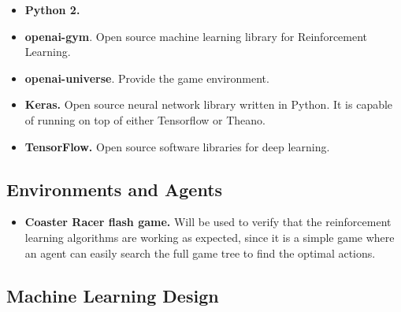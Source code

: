 \documentclass{article}
\begin{document}
\begin{itemize}

    \item \textbf{Python 2.}

    \item \textbf{openai-gym}. Open source machine learning library for Reinforcement Learning.
    
    \item \textbf{openai-universe}. Provide the game environment.

    \item \textbf{Keras.} Open source neural network library written in Python. It is capable of
        running on top of either Tensorflow or Theano.

    \item \textbf{TensorFlow.} Open source software libraries for deep learning.

\end{itemize}

\subsection{Environments and Agents}

\begin{itemize}

    \item \textbf{Coaster Racer flash game.} Will be used to verify that the reinforcement learning algorithms
        are working as expected, since it is a simple game where an agent can easily search the full
        game tree to find the optimal actions.

\end{itemize}

\subsection{Machine Learning Design}
\end{document}
